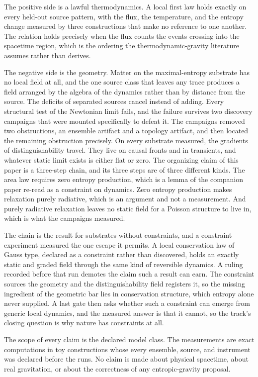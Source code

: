 \documentclass[aps,pre,reprint,nofootinbib]{revtex4-2}
\begin{document}
The positive side is a lawful thermodynamics.  A local first law
holds exactly on every held-out source pattern, with the flux, the
temperature, and the entropy change measured by three constructions
that make no reference to one another.  The relation holds precisely
when the flux counts the events crossing into the spacetime region,
which is the ordering the thermodynamic-gravity literature assumes
rather than derives.

The negative side is the geometry.  Matter on the maximal-entropy
substrate has no local field at all, and the one source class that
leaves any trace produces a field arranged by the algebra of the
dynamics rather than by distance from the source.  The deficits of
separated sources cancel instead of adding.  Every structural test of
the Newtonian limit fails, and the failure survives two discovery
campaigns that were mounted specifically to defeat it.  The campaigns
removed two obstructions, an ensemble artifact and a topology
artifact, and then located the remaining obstruction precisely.  On
every substrate measured, the gradients of distinguishability travel.
They live on causal fronts and in transients, and whatever static
limit exists is either flat or zero.  The organizing claim of this
paper is a three-step chain, and its three steps are of three
different kinds.  The area law requires zero entropy production,
which is a lemma of the companion paper re-read as a constraint on
dynamics.  Zero entropy production makes relaxation purely
radiative, which is an argument and not a measurement.  And purely
radiative relaxation leaves no static field for a Poisson structure
to live in, which is what the campaigns measured.

The chain is the result for substrates without constraints, and a
constraint experiment measured the one escape it permits.  A local
conservation law of Gauss type, declared as a constraint rather than
discovered, holds an exactly static and graded field through the same
kind of reversible dynamics.  A ruling recorded before that run
demotes the claim such a result can earn.  The constraint sources the
geometry and the distinguishability field registers it, so the
missing ingredient of the geometric bar lies in conservation
structure, which entropy alone never supplied.  A last gate then
asks whether such a constraint can emerge from generic local
dynamics, and the measured answer is that it cannot, so the track's
closing question is why nature has constraints at all.

The scope of every claim is the declared model class.  The
measurements are exact computations in toy constructions whose every
ensemble, source, and instrument was declared before the runs.  No
claim is made about physical spacetime, about real gravitation, or
about the correctness of any entropic-gravity proposal.
\end{document}
